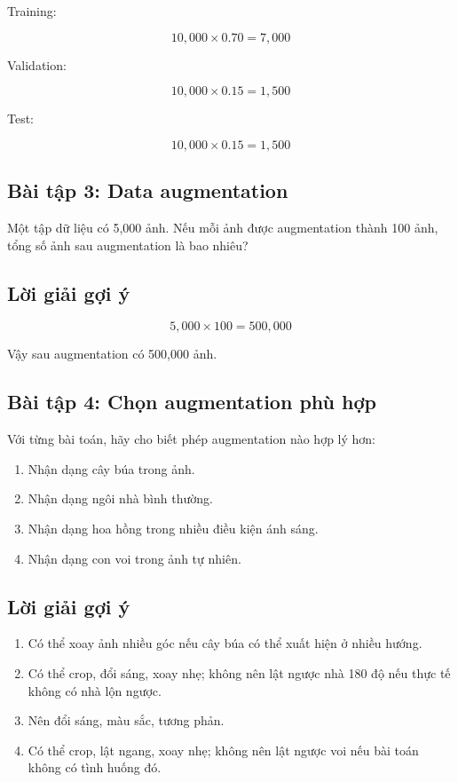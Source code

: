 Training:

\[
    10,000 \times 0.70 = 7,000
\]

Validation:

\[
    10,000 \times 0.15 = 1,500
\]

Test:

\[
    10,000 \times 0.15 = 1,500
\]

\subsection*{Bài tập 3: Data augmentation}

Một tập dữ liệu có 5,000 ảnh. Nếu mỗi ảnh được augmentation thành 100 ảnh, tổng số ảnh sau augmentation là bao nhiêu?

\subsection*{Lời giải gợi ý}

\[
    5,000 \times 100 = 500,000
\]

Vậy sau augmentation có 500,000 ảnh.

\subsection*{Bài tập 4: Chọn augmentation phù hợp}

Với từng bài toán, hãy cho biết phép augmentation nào hợp lý hơn:

\begin{enumerate}
    \item Nhận dạng cây búa trong ảnh.
    \item Nhận dạng ngôi nhà bình thường.
    \item Nhận dạng hoa hồng trong nhiều điều kiện ánh sáng.
    \item Nhận dạng con voi trong ảnh tự nhiên.
\end{enumerate}

\subsection*{Lời giải gợi ý}

\begin{enumerate}
    \item Có thể xoay ảnh nhiều góc nếu cây búa có thể xuất hiện ở nhiều hướng.
    \item Có thể crop, đổi sáng, xoay nhẹ; không nên lật ngược nhà 180 độ nếu thực tế không có nhà lộn ngược.
    \item Nên đổi sáng, màu sắc, tương phản.
    \item Có thể crop, lật ngang, xoay nhẹ; không nên lật ngược voi nếu bài toán không có tình huống đó.
\end{enumerate}

